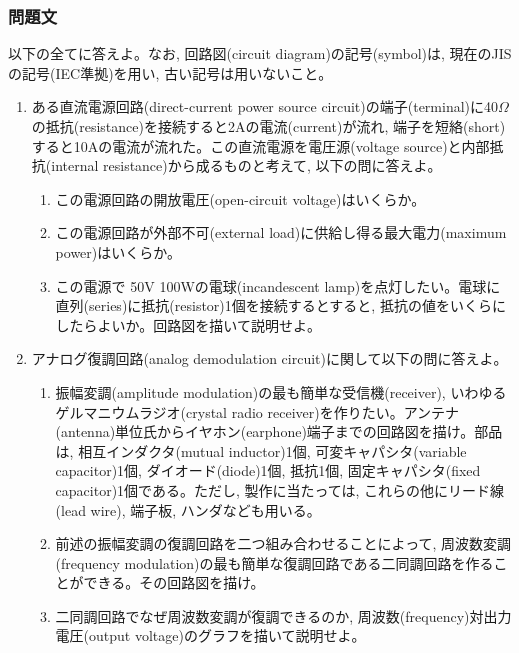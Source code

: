 \documentclass[dvipdfmx,titlepage, 11pt, a4paper]{jsarticle}%
\begin{document}
\subsubsection{問題文}
以下の全てに答えよ。なお, 回路図(circuit diagram)の記号(symbol)は, 現在のJISの記号(IEC準拠)を用い, 古い記号は用いないこと。
\begin{enumerate}[(1)]
  \setlength{\itemsep}{15pt}
\item ある直流電源回路(direct-current power source circuit)の端子(terminal)に40$\Omega$の抵抗(resistance)を接続すると2Aの電流(current)が流れ, 端子を短絡(short)すると10Aの電流が流れた。この直流電源を電圧源(voltage source)と内部抵抗(internal resistance)から成るものと考えて, 以下の問に答えよ。
  \begin{enumerate}[(${1}-$a)]
    \setlength{\itemsep}{15pt}
  \item この電源回路の開放電圧(open-circuit voltage)はいくらか。
  \item この電源回路が外部不可(external load)に供給し得る最大電力(maximum power)はいくらか。
  \item この電源で 50V 100Wの電球(incandescent lamp)を点灯したい。電球に直列(series)に抵抗(resistor)1個を接続するとすると, 抵抗の値をいくらにしたらよいか。回路図を描いて説明せよ。
  \end{enumerate}
\item アナログ復調回路(analog demodulation circuit)に関して以下の問に答えよ。
  \begin{enumerate}[(${2}-$a)]
    \setlength{\itemsep}{15pt}
  \item 振幅変調(amplitude modulation)の最も簡単な受信機(receiver), いわゆるゲルマニウムラジオ(crystal radio receiver)を作りたい。アンテナ(antenna)単位氏からイヤホン(earphone)端子までの回路図を描け。部品は, 相互インダクタ(mutual inductor)1個, 可変キャパシタ(variable capacitor)1個, ダイオード(diode)1個, 抵抗1個, 固定キャパシタ(fixed capacitor)1個である。ただし, 製作に当たっては, これらの他にリード線(lead wire), 端子板, ハンダなども用いる。
  \item 前述の振幅変調の復調回路を二つ組み合わせることによって, 周波数変調(frequency modulation)の最も簡単な復調回路である二同調回路を作ることができる。その回路図を描け。
  \item 二同調回路でなぜ周波数変調が復調できるのか, 周波数(frequency)対出力電圧(output voltage)のグラフを描いて説明せよ。
  \end{enumerate}
\end{enumerate}
\newpage
\end{document}

